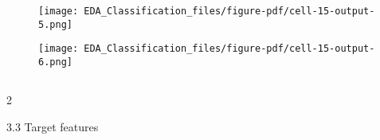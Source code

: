 \documentclass[
  letterpaper,
  DIV=11,
  numbers=noendperiod]{scrartcl}
\begin{document}
\begin{figure}[H]

{\centering \texttt{[image: EDA\_Classification\_files/figure-pdf/cell-15-output-5.png]}

}

\end{figure}

\begin{figure}[H]

{\centering \texttt{[image: EDA\_Classification\_files/figure-pdf/cell-15-output-6.png]}

}

\end{figure}

\hypertarget{section-7}{%
\subsection{}\label{section-7}}

2

3.3 Target features
\end{document}
